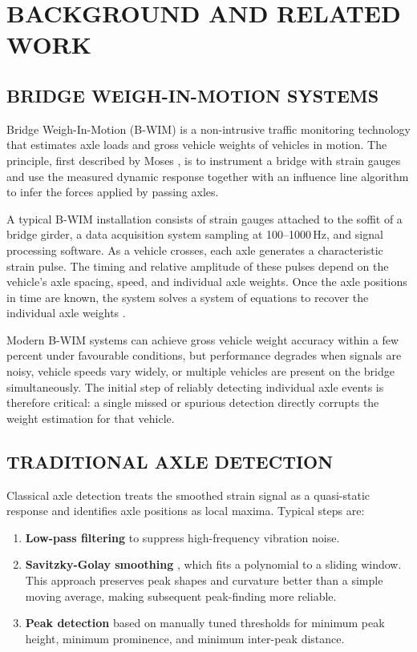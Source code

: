 \chapter{BACKGROUND AND RELATED WORK}

\section{BRIDGE WEIGH-IN-MOTION SYSTEMS}

Bridge Weigh-In-Motion (B-WIM) is a non-intrusive traffic monitoring technology
that estimates axle loads and gross vehicle weights of vehicles in motion. The
principle, first described by Moses \cite{Moses1979}, is to instrument a bridge
with strain gauges and use the measured dynamic response together with an
influence line algorithm to infer the forces applied by passing axles.

A typical B-WIM installation consists of strain gauges attached to the soffit of
a bridge girder, a data acquisition system sampling at 100--1000\,Hz, and signal
processing software. As a vehicle crosses, each axle generates a characteristic
strain pulse. The timing and relative amplitude of these pulses depend on the
vehicle's axle spacing, speed, and individual axle weights. Once the axle
positions in time are known, the system solves a system of equations to recover
the individual axle weights \cite{Soberl2025}.

Modern B-WIM systems can achieve gross vehicle weight accuracy within a few
percent under favourable conditions, but performance degrades when signals are
noisy, vehicle speeds vary widely, or multiple vehicles are present on the bridge
simultaneously. The initial step of reliably detecting individual axle events is
therefore critical: a single missed or spurious detection directly corrupts the
weight estimation for that vehicle.

\section{TRADITIONAL AXLE DETECTION}

Classical axle detection treats the smoothed strain signal as a quasi-static
response and identifies axle positions as local maxima. Typical steps are:

\begin{enumerate}
    \item \textbf{Low-pass filtering} to suppress high-frequency vibration noise.
    \item \textbf{Savitzky-Golay smoothing} \cite{SavitzkyGolay1964}, which fits
          a polynomial to a sliding window. This approach preserves peak shapes
          and curvature better than a simple moving average, making subsequent
          peak-finding more reliable.
    \item \textbf{Peak detection} based on manually tuned thresholds for minimum
          peak height, minimum prominence, and minimum inter-peak distance.
\end{enumerate}

